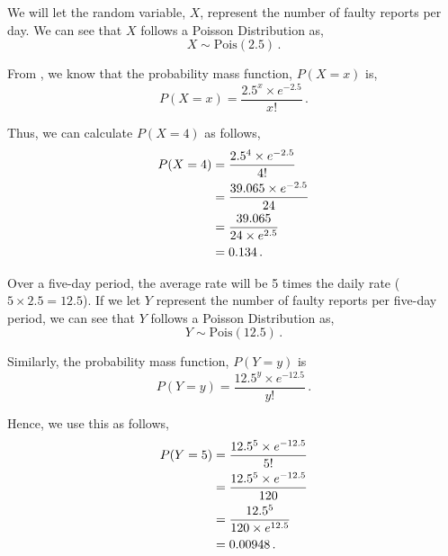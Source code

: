 \begin{subquestions}
\subquestion

We will let the random variable, $X$, represent the number of faulty reports per day. We can see that $X$ follows a Poisson Distribution as,
\begin{equation}
	X \sim \text{Pois}(2.5) \,.
\end{equation}

\begin{subsubquestions}
	
\subsubquestion

From , we know that the probability mass function, $P(X=x)$ is,
\begin{equation}
	P(X=x) = \frac{2.5^x \times e^{-2.5}}{x!} \,.
\end{equation}

Thus, we can calculate $P(X=4)$ as follows,
\begin{align}
	P(X=4) & = \frac{2.5^4 \times e^{-2.5}}{4!} \nonumber \\
	       & = \frac{39.065 \times e^{-2.5}}{24} \nonumber \\
	       & = \frac{39.065}{24 \times e^{2.5}} \nonumber \\
	       & = 0.134 \,.
\end{align}
	

\subsubquestion

Over a five-day period, the average rate will be 5 times the daily rate ($5 \times 2.5 = 12.5$). If we let $Y$ represent the number of faulty reports per five-day period, we can see that $Y$ follows a Poisson Distribution as,
\begin{equation}
	Y \sim \text{Pois}(12.5) \,.
\end{equation}

Similarly, the probability mass function, $P(Y=y)$ is
\begin{equation}
	P(Y=y) = \frac{12.5^y \times e^{-12.5}}{y!} \,.
\end{equation}

Hence, we use this as follows,
\begin{align}
	P(Y=5) & = \frac{12.5^5 \times e^{-12.5}}{5!} \nonumber \\
	       & = \frac{12.5^5 \times e^{-12.5}}{120} \nonumber \\
	       & = \frac{12.5^5}{120 \times e^{12.5}} \nonumber \\
	       & = 0.00948 \,.
\end{align}

\end{subsubquestions}
\end{subquestions}